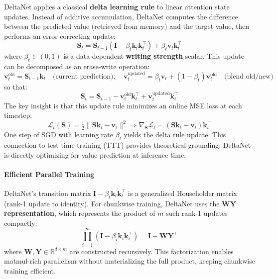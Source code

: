 DeltaNet \citep{yang_deltanet_2024} applies a classical \textbf{delta learning rule} to linear attention state updates. Instead of additive accumulation, DeltaNet computes the difference between the predicted value (retrieved from memory) and the target value, then performs an error-correcting update:
\[
\mathbf{S}_t = \mathbf{S}_{t-1}(\mathbf{I} - \beta_t \mathbf{k}_t \mathbf{k}_t^\top) + \beta_t \mathbf{v}_t \mathbf{k}_t^\top
\]
where $\beta_t \in (0,1)$ is a data-dependent \textbf{writing strength} scalar. This update can be decomposed as an erase-write operation:
\[
\mathbf{v}_t^\text{old} = \mathbf{S}_{t-1} \mathbf{k}_t \quad \text{(current prediction)}, \quad
\mathbf{v}_t^\text{updated} = \beta_t \mathbf{v}_t + (1-\beta_t)\mathbf{v}_t^\text{old} \quad \text{(blend old/new)}
\]
so that:
\[
\mathbf{S}_t = \mathbf{S}_{t-1} - \mathbf{v}_t^\text{old}\mathbf{k}_t^\top + \mathbf{v}_t^\text{updated}\mathbf{k}_t^\top
\]
The key insight is that this update rule minimizes an online MSE loss at each timestep:
\[
\mathcal{L}_t(\mathbf{S}) = \tfrac{1}{2}\|\mathbf{S}\mathbf{k}_t - \mathbf{v}_t\|^2 \Rightarrow \nabla_{\mathbf{S}} \mathcal{L}_t = (\mathbf{S}\mathbf{k}_t - \mathbf{v}_t)\mathbf{k}_t^\top
\]
One step of SGD with learning rate $\beta_t$ yields the delta rule update. This connection to test-time training (TTT) provides theoretical grounding: DeltaNet is directly optimizing for value prediction at inference time.

\paragraph{Efficient Parallel Training}

DeltaNet's transition matrix $\mathbf{I} - \beta_t \mathbf{k}_t \mathbf{k}_t^\top$ is a generalized Householder matrix (rank-1 update to identity). For chunkwise training, DeltaNet uses the \textbf{WY representation}, which represents the product of $m$ such rank-1 updates compactly:
\[
\prod_{i=1}^{m} (\mathbf{I} - \beta_i \mathbf{k}_i \mathbf{k}_i^\top) = \mathbf{I} - \mathbf{W}\mathbf{Y}^\top
\]
where $\mathbf{W}, \mathbf{Y} \in \mathbb{R}^{d \times m}$ are constructed recursively. This factorization enables matmul-rich parallelism without materializing the full product, keeping chunkwise training efficient.

